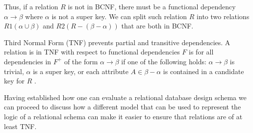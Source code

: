 Thus, if a relation $R$ is not in BCNF, there must be a functional dependency $\alpha \rightarrow \beta$ where $\alpha$ is not a super key. 
We can split such relation $R$ into two relations $R1(\alpha \cup \beta)$ and $R2(R-(\beta-\alpha))$ that are both in BCNF.

Third Normal Form (TNF) prevents partial and transitive dependencies\cite{MontayaNormalForms}.
A relation is in TNF with respect to functional dependencies $F$ is for all dependencies in $F^+$ of the form $\alpha \rightarrow \beta$ if one of the following holds: 
$\alpha \rightarrow \beta$ is trivial, $\alpha$ is a super key, or each attribute $A \in \beta-\alpha$ is contained in a candidate key for $R$ \cite{DBSBook}.

Having established how one can evaluate a relational database design schema we can proceed to discuss how a different model that can be used to represent the logic of a relational schema can make it easier to ensure that relations are of at least TNF.


